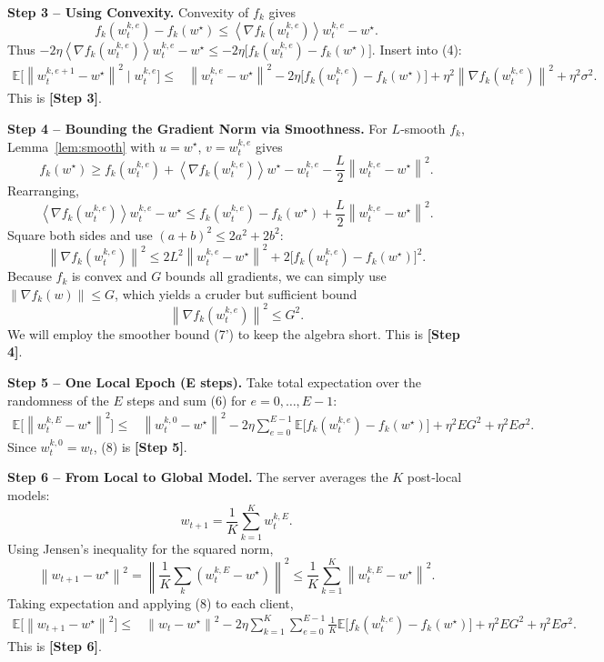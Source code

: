 \documentclass{article}
\newcommand{\E}{\mathbb{E}}
\newcommand{\norm}[1]{\left\|#1\right\|}
\newcommand{\inner}[1]{\left\langle #1 \right\rangle}
\newcommand{\grad}{\nabla}
\begin{document}
\bigskip
\noindent\textbf{Step 3 – Using Convexity.}  
Convexity of $f_k$ gives
\[
f_k(w_{t}^{k,e})-f_k(w^\star)\le \inner{\grad f_k(w_{t}^{k,e})}{w_{t}^{k,e}-w^\star}. \tag{5}
\]
Thus $-2\eta\inner{\grad f_k(w_{t}^{k,e})}{w_{t}^{k,e}-w^\star}
\le -2\eta\bigl[f_k(w_{t}^{k,e})-f_k(w^\star)\bigr]$.  
Insert into (4):
\begin{align}
\E\!\bigl[\norm{w_{t}^{k,e+1}-w^\star}^{2}\mid w_{t}^{k,e}\bigr]
\le &\norm{w_{t}^{k,e}-w^\star}^{2}
   -2\eta\bigl[f_k(w_{t}^{k,e})-f_k(w^\star)\bigr]
   +\eta^{2}\norm{\grad f_k(w_{t}^{k,e})}^{2}
   +\eta^{2}\sigma^{2}. \tag{6}
\end{align}
This is \textbf{[Step 3]}.

\bigskip
\noindent\textbf{Step 4 – Bounding the Gradient Norm via Smoothness.}  
For $L$‑smooth $f_k$, Lemma~\ref{lem:smooth} with $u=w^\star$, $v=w_{t}^{k,e}$ gives
\[
f_k(w^\star)\ge f_k(w_{t}^{k,e})+\inner{\grad f_k(w_{t}^{k,e})}{w^\star-w_{t}^{k,e}}
          -\frac{L}{2}\norm{w_{t}^{k,e}-w^\star}^{2}.
\]
Rearranging,
\[
\inner{\grad f_k(w_{t}^{k,e})}{w_{t}^{k,e}-w^\star}
\le f_k(w_{t}^{k,e})-f_k(w^\star)+\frac{L}{2}\norm{w_{t}^{k,e}-w^\star}^{2}.
\]
Square both sides and use $(a+b)^2\le2a^2+2b^2$:
\[
\norm{\grad f_k(w_{t}^{k,e})}^{2}
\le 2L^{2}\norm{w_{t}^{k,e}-w^\star}^{2}+2\bigl[f_k(w_{t}^{k,e})-f_k(w^\star)\bigr]^{2}.
\tag{7}
\]
Because $f_k$ is convex and $G$ bounds all gradients, we can simply use $\norm{\grad f_k(w)}\le G$, which yields a cruder but sufficient bound
\[
\norm{\grad f_k(w_{t}^{k,e})}^{2}\le G^{2}. \tag{7'}
\]
We will employ the smoother bound (7') to keep the algebra short. This is \textbf{[Step 4]}.

\bigskip
\noindent\textbf{Step 5 – One Local Epoch (E steps).}  
Take total expectation over the randomness of the $E$ steps and sum (6) for $e=0,\dots,E-1$:
\begin{align}
\E\!\bigl[\norm{w_{t}^{k,E}-w^\star}^{2}\bigr]
\le &
\norm{w_{t}^{k,0}-w^\star}^{2}
-2\eta\sum_{e=0}^{E-1}\E\!\bigl[f_k(w_{t}^{k,e})-f_k(w^\star)\bigr]
+\eta^{2}E G^{2}
+\eta^{2}E\sigma^{2}. \tag{8}
\end{align}
Since $w_{t}^{k,0}=w_t$, (8) is \textbf{[Step 5]}.

\bigskip
\noindent\textbf{Step 6 – From Local to Global Model.}  
The server averages the $K$ post‑local models:
\[
w_{t+1}= \frac1K\sum_{k=1}^{K} w_{t}^{k,E}.
\]
Using Jensen’s inequality for the squared norm,
\[
\norm{w_{t+1}-w^\star}^{2}
= \norm{\frac1K\sum_{k} (w_{t}^{k,E}-w^\star)}^{2}
\le \frac1K\sum_{k=1}^{K}\norm{w_{t}^{k,E}-w^\star}^{2}. \tag{9}
\]
Taking expectation and applying (8) to each client,
\begin{align}
\E\!\bigl[\norm{w_{t+1}-w^\star}^{2}\bigr]
\le &
\norm{w_t-w^\star}^{2}
-2\eta\sum_{k=1}^{K}\sum_{e=0}^{E-1}
   \frac{1}{K}\E\!\bigl[f_k(w_{t}^{k,e})-f_k(w^\star)\bigr]
   +\eta^{2}E G^{2}
   +\eta^{2}E\sigma^{2}. \tag{10}
\end{align}
This is \textbf{[Step 6]}.
\end{document}
